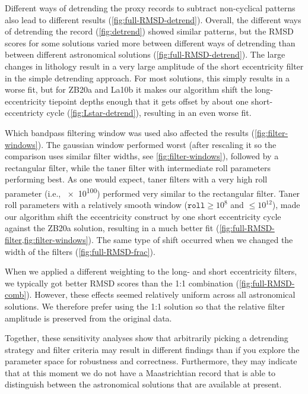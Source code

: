 \documentclass[draft]{agujournal2019}
\begin{document}
Different ways of detrending the proxy records to subtract non-cyclical patterns also lead to different results (\cref{fig:full-RMSD-detrend}).
Overall, the different ways of detrending the record (\cref{fig:detrend}) showed similar patterns, but the \gls{RMSD} scores for some solutions varied more between different ways of detrending than between different astronomical solutions (\cref{fig:full-RMSD-detrend}).
The large changes in lithology result in a very large amplitude of the short eccentricity filter in the simple detrending approach.
For most solutions, this simply results in a worse fit, but for ZB20a and La10b it makes our algorithm shift the long- eccentricity tiepoint depths enough that it gets offset by about one short-eccentricty cycle (\cref{fig:Lstar-detrend}), resulting in an even worse fit.

Which bandpass filtering window was used also affected the results (\cref{fig:filter-windows}).
The gaussian window performed worst (after rescaling it so the comparison uses similar filter widths, see \cref{fig:filter-windows}), followed by a rectangular filter, while the taner filter with intermediate roll parameters performing best.
As one would expect, taner filters with a very high roll parameter (i.e., \num{e100}) performed very similar to the rectangular filter.
Taner roll parameters with a relatively smooth window (\(\texttt{roll} \ge 10^{8}\) and \(\le 10^{12}\)), made our algorithm shift the eccentricity construct by one short eccentricity cycle against the ZB20a solution, resulting in a much better fit (\cref{fig:full-RMSD-filter,fig:filter-windows}).
The same type of shift occurred when we changed the width of the filters (\cref{fig:full-RMSD-frac}).

When we applied a different weighting to the long- and short eccentricity filters, we typically got better \gls{RMSD} scores than the 1:1 combination (\cref{fig:full-RMSD-comb}).
However, these effects seemed relatively uniform across all astronomical solutions.
We therefore prefer using the 1:1 solution so that the relative filter amplitude is preserved from the original data.

Together, these sensitivity analyses show that arbitrarily picking a detrending strategy and filter criteria may result in different findings than if you explore the parameter space for robustness and correctness.
Furthermore, they may indicate that at this moment we do not have a Maastrichtian record that is able to distinguish between the astronomical solutions that are available at present.
\end{document}
